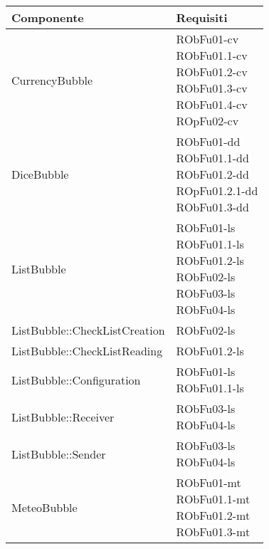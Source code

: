 \begin{center}
\begin{longtable}{|
*{1}{>{\centering\arraybackslash}p{7.5cm}|}
*{1}{>{\centering\arraybackslash}p{2.5cm}|}}
\hline \textbf{Componente} & \textbf{Requisiti}\\
\hline \endhead
\hline \endfoot

CurrencyBubble & \makecell{RObFu01-cv
\\RObFu01.1-cv
\\RObFu01.2-cv
\\RObFu01.3-cv
\\RObFu01.4-cv
\\ROpFu02-cv
\\}\\\hline
DiceBubble & \makecell{RObFu01-dd
\\RObFu01.1-dd
\\RObFu01.2-dd
\\ROpFu01.2.1-dd
\\RObFu01.3-dd
\\}\\\hline
ListBubble & \makecell{RObFu01-ls
\\RObFu01.1-ls
\\RObFu01.2-ls
\\RObFu02-ls
\\RObFu03-ls
\\RObFu04-ls
\\}\\\hline
ListBubble::CheckListCreation & \makecell{RObFu02-ls
\\}\\\hline
ListBubble::CheckListReading & \makecell{RObFu01.2-ls
\\}\\\hline
ListBubble::Configuration & \makecell{RObFu01-ls
\\RObFu01.1-ls
\\}\\\hline
ListBubble::Receiver & \makecell{RObFu03-ls
\\RObFu04-ls
\\}\\\hline
ListBubble::Sender & \makecell{RObFu03-ls
\\RObFu04-ls
\\}\\\hline
MeteoBubble & \makecell{RObFu01-mt
\\RObFu01.1-mt
\\RObFu01.2-mt
\\RObFu01.3-mt
\\}\\\hline

\end{longtable}
\end{center}
